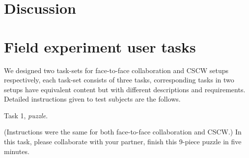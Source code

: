\documentclass[12pt,twoside]{article}
\begin{document}
\section{Discussion}
\label{sec:discussion}



\appendix
\section{Field experiment user tasks}
\label{appdx:user tasks}

We designed two task-sets for face-to-face collaboration and CSCW setups respectively, each task-set consists of three tasks, corresponding tasks in two setups have equivalent content but with different descriptions and requirements. Detailed instructions given to test subjects are the follows.

Task 1, \textit{puzzle}.

(Instructions were the same for both face-to-face collaboration and CSCW.) In this task, please collaborate with your partner, finish this 9-piece puzzle in five minutes.
\end{document}
